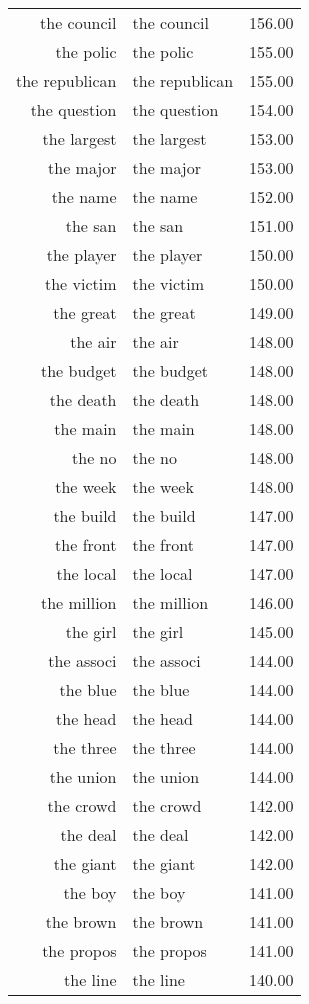 \begin{table}[ht]
\begin{tabular}{rlr}
  the council & the council & 156.00 \\ 
  the polic & the polic & 155.00 \\ 
  the republican & the republican & 155.00 \\ 
  the question & the question & 154.00 \\ 
  the largest & the largest & 153.00 \\ 
  the major & the major & 153.00 \\ 
  the name & the name & 152.00 \\ 
  the san & the san & 151.00 \\ 
  the player & the player & 150.00 \\ 
  the victim & the victim & 150.00 \\ 
  the great & the great & 149.00 \\ 
  the air & the air & 148.00 \\ 
  the budget & the budget & 148.00 \\ 
  the death & the death & 148.00 \\ 
  the main & the main & 148.00 \\ 
  the no & the no & 148.00 \\ 
  the week & the week & 148.00 \\ 
  the build & the build & 147.00 \\ 
  the front & the front & 147.00 \\ 
  the local & the local & 147.00 \\ 
  the million & the million & 146.00 \\ 
  the girl & the girl & 145.00 \\ 
  the associ & the associ & 144.00 \\ 
  the blue & the blue & 144.00 \\ 
  the head & the head & 144.00 \\ 
  the three & the three & 144.00 \\ 
  the union & the union & 144.00 \\ 
  the crowd & the crowd & 142.00 \\ 
  the deal & the deal & 142.00 \\ 
  the giant & the giant & 142.00 \\ 
  the boy & the boy & 141.00 \\ 
  the brown & the brown & 141.00 \\ 
  the propos & the propos & 141.00 \\ 
  the line & the line & 140.00 \\ 

\end{tabular}
\end{table}

